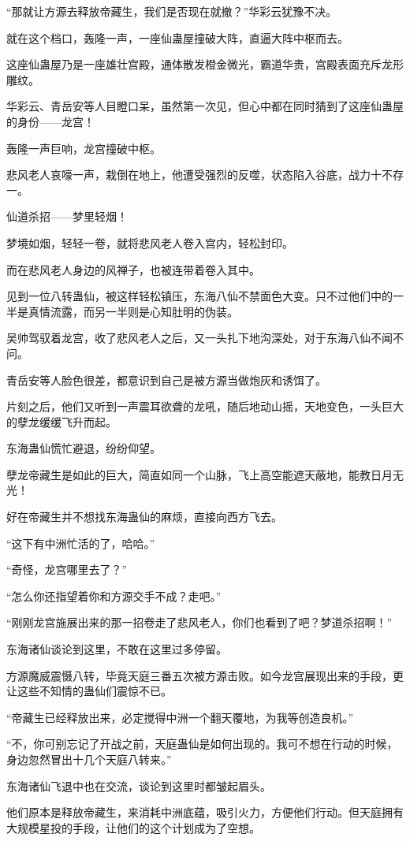 \begin{this_body}
“那就让方源去释放帝藏生，我们是否现在就撤？”华彩云犹豫不决。

就在这个档口，轰隆一声，一座仙蛊屋撞破大阵，直逼大阵中枢而去。

这座仙蛊屋乃是一座雄壮宫殿，通体散发橙金微光，霸道华贵，宫殿表面充斥龙形雕纹。

华彩云、青岳安等人目瞪口呆，虽然第一次见，但心中都在同时猜到了这座仙蛊屋的身份——龙宫！

轰隆一声巨响，龙宫撞破中枢。

悲风老人哀嚎一声，栽倒在地上，他遭受强烈的反噬，状态陷入谷底，战力十不存一。

仙道杀招——梦里轻烟！

梦境如烟，轻轻一卷，就将悲风老人卷入宫内，轻松封印。

而在悲风老人身边的风禅子，也被连带着卷入其中。

见到一位八转蛊仙，被这样轻松镇压，东海八仙不禁面色大变。只不过他们中的一半是真情流露，而另一半则是心知肚明的伪装。

吴帅驾驭着龙宫，收了悲风老人之后，又一头扎下地沟深处，对于东海八仙不闻不问。

青岳安等人脸色很差，都意识到自己是被方源当做炮灰和诱饵了。

片刻之后，他们又听到一声震耳欲聋的龙吼，随后地动山摇，天地变色，一头巨大的孽龙缓缓飞升而起。

东海蛊仙慌忙避退，纷纷仰望。

孽龙帝藏生是如此的巨大，简直如同一个山脉，飞上高空能遮天蔽地，能教日月无光！

好在帝藏生并不想找东海蛊仙的麻烦，直接向西方飞去。

“这下有中洲忙活的了，哈哈。”

“奇怪，龙宫哪里去了？”

“怎么你还指望着你和方源交手不成？走吧。”

“刚刚龙宫施展出来的那一招卷走了悲风老人，你们也看到了吧？梦道杀招啊！”

东海诸仙谈论到这里，不敢在这里过多停留。

方源魔威震慑八转，毕竟天庭三番五次被方源击败。如今龙宫展现出来的手段，更让这些不知情的蛊仙们震惊不已。

“帝藏生已经释放出来，必定搅得中洲一个翻天覆地，为我等创造良机。”

“不，你可别忘记了开战之前，天庭蛊仙是如何出现的。我可不想在行动的时候，身边忽然冒出十几个天庭八转来。”

东海诸仙飞退中也在交流，谈论到这里时都皱起眉头。

他们原本是释放帝藏生，来消耗中洲底蕴，吸引火力，方便他们行动。但天庭拥有大规模星投的手段，让他们的这个计划成为了空想。

\end{this_body}

